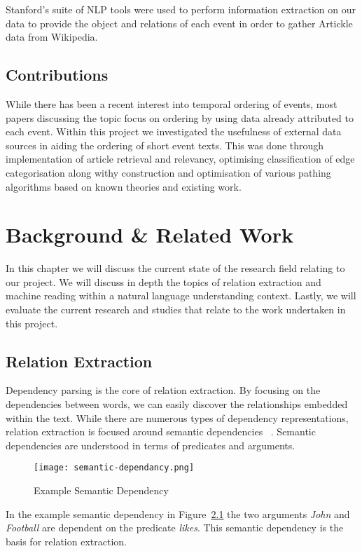 \documentclass[bsc,frontabs,twoside,singlespacing,parskip,deptreport]{infthesis}     %
\begin{document}
Stanford's suite of NLP tools were used to perform information extraction on our data to provide the
object and relations of each event in order to gather Artickle data from Wikipedia.
\section{Contributions}
While there has been a recent interest into temporal ordering of events, most papers discussing the topic focus on
ordering by using data already attributed to each event. Within this project we investigated the usefulness of
external data sources in aiding the ordering of short event texts. This was done through implementation
of article retrieval and relevancy, optimising classification of edge categorisation along withy construction and optimisation
of various pathing algorithms based on known theories and existing work. 
\chapter{Background \& Related Work}
In this chapter we will discuss the current state of the research field relating to our project.
We will discuss in depth the topics of relation extraction and machine reading within a natural language understanding
context. Lastly, we will evaluate the current research and studies that relate to the work undertaken in this project.

\section{Relation Extraction}\label{sec:IE-bg}
Dependency parsing is the core of relation extraction.
By focusing on the dependencies between words, we can easily discover the relationships embedded within the text.
While there are numerous types of dependency representations, relation extraction is focused around semantic dependencies ~\cite{mcclosky2011event}.
Semantic dependencies are understood in terms of predicates and arguments.
\begin{figure}[H]
  \centering
  \texttt{[image: semantic-dependancy.png]}
  \caption{Example Semantic Dependency}
  \label{fig:semantic-dependancy}
\end{figure}

In the example semantic dependency in Figure~\ref{fig:semantic-dependancy} the two arguments \textit{John} and \textit{Football} are dependent
on the predicate \textit{likes}. This semantic dependency is the basis for relation extraction.
\end{document}

